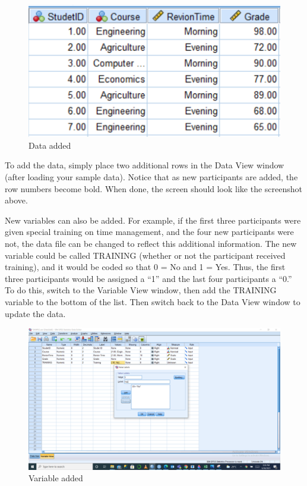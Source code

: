 \documentclass[
]{book}
\begin{document}
\begin{figure}
\centering
\includegraphics{Modification.png}
\caption{Data added}
\end{figure}

To add the data, simply place two additional rows in the Data View window (after loading your sample data). Notice that as new participants are added, the row numbers become bold. When done, the screen should look like the screenshot above.

New variables can also be added. For example, if the first three participants were given special training on time management, and the four new participants were not, the data file can be changed to reflect this additional information. The new variable could be called TRAINING (whether or not the participant received training), and it would be coded so that 0 = No and 1 = Yes. Thus, the first three participants would be assigned a ``1'' and the last four participants a ``0.'' To do this, switch to the Variable View window, then add the TRAINING variable to the bottom of the list. Then switch back to the Data View window to update the data.

\begin{figure}
\centering
\includegraphics{Modified.png}
\caption{Variable added}
\end{figure}
\end{document}
